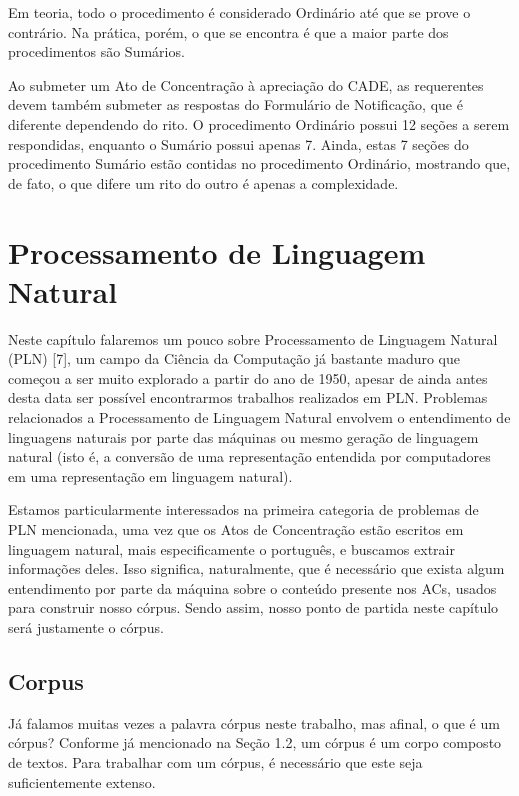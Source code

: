 \documentclass[11pt]{report}
\begin{document}
Em teoria, todo o procedimento é considerado Ordinário até que se prove o contrário. Na prática, porém, o que se encontra é que a maior parte dos procedimentos são Sumários.

Ao submeter um Ato de Concentração à apreciação do CADE, as requerentes devem também submeter as respostas do Formulário de Notificação, que é diferente dependendo do rito.
O procedimento Ordinário possui 12 seções a serem respondidas, enquanto o Sumário possui apenas 7. Ainda, estas 7 seções do procedimento Sumário estão contidas no
procedimento Ordinário, mostrando que, de fato, o que difere um rito do outro é apenas a complexidade.

\pagebreak
\chapter{Processamento de Linguagem Natural}

\indent\indent Neste capítulo falaremos um pouco sobre Processamento de Linguagem Natural (PLN) [7], um campo da Ciência da Computação já bastante maduro que começou a ser muito
explorado a partir do ano de 1950, apesar de ainda antes desta data ser possível encontrarmos trabalhos realizados em PLN. Problemas relacionados a
Processamento de Linguagem Natural envolvem o entendimento de linguagens naturais por parte das máquinas ou mesmo geração de linguagem natural (isto é, a conversão
de uma representação entendida por computadores em uma representação em linguagem natural).

Estamos particularmente interessados na primeira
categoria de problemas de PLN mencionada, uma vez que os Atos de Concentração estão escritos em linguagem natural, mais especificamente o português, e buscamos extrair informações
deles. Isso significa, naturalmente, que é necessário que exista algum entendimento por parte da máquina sobre o conteúdo presente nos ACs, usados para construir nosso córpus. Sendo
assim, nosso ponto de partida neste capítulo será justamente o córpus.

\section{Corpus}

\indent\indent Já falamos muitas vezes a palavra córpus neste trabalho, mas afinal, o que é um córpus? Conforme já mencionado na Seção 1.2, um córpus é um corpo composto de textos. Para trabalhar com um córpus, é necessário que este seja suficientemente extenso.
\end{document}
